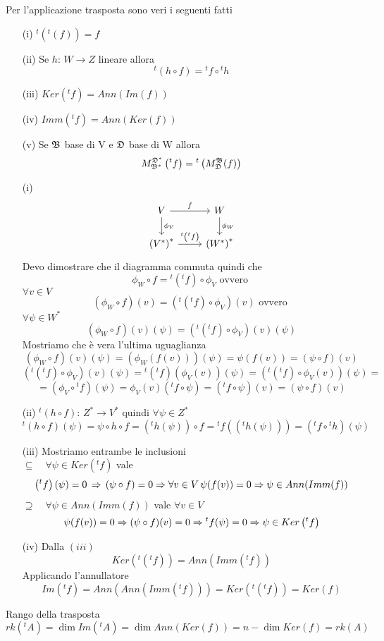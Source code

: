 \begin{prop}Per l'applicazione trasposta sono veri i seguenti fatti
\begin{itemize}
\item[(i)] ${}^t \left( {}^t (f) \right)=f$
\item[(ii)] Se $h:\, W \to Z$ lineare allora
$$ {}^t(h \circ f ) = {}^t f \circ {}^t h$$
\item[(iii)]$ Ker ({}^t f )=Ann(Im (f) ) $ 
\item[(iv)] $Imm ({}^t f )=Ann(Ker (f) ) $
\item[(v)] Se $\mathfrak{B} $ base di V e $\mathfrak{D}$ base di W allora
$$ M_{\mathfrak{B}^*} ^{\mathfrak{D}^*} \left({}^tf \right) = {}^t \left( M_{\mathfrak{D}} ^{\mathfrak{B}} (f) \right)$$
\end{itemize}
\proof \bianco
\begin{itemize}
\item[(i)]
$$
\begin{tikzcd}
V 
\arrow[r,"f"]
\arrow{d}{\phi_V} 
&W 
\arrow{d}{\phi_W}\\
\left( V ^* \right)^* 
\arrow{r}{{}^t \left( {}^t f\right)}
&\left( W ^* \right)^* 
\end{tikzcd} $$
Devo dimostrare che il diagramma commuta quindi che 
$$ \phi_W \circ f = {}^t \left( {}^t f\right) \circ \phi_V \text{ ovvero }$$
$ \forall v \in V $
$$( \phi_W \circ f)(v) =  \left( {}^t \left( {}^t f\right) \circ \phi_V \right) (v) \text{ ovvero } $$
$\forall \psi \in W^* $ 
$$( \phi_W \circ f)(v) (\psi) =  \left( {}^t \left( {}^t f\right) \circ \phi_V \right) (v) (\psi)  $$
Mostriamo che \`e vera l'ultima uguaglianza 
$$ ( \phi_W \circ f)(v) (\psi) =( \phi_W (f(v)) ) (\psi)=\psi(f(v))=(\psi \circ f ) (v) $$
 $$\left( {}^t \left( {}^t f\right) \circ \phi_V \right) (v) (\psi)= 
{}^t \left( {}^t f \right) (  \phi_V(v))( \psi) =\left( {}^t \left( {}^t f \right)  \circ \phi_V (v)\right)(\psi)=$$
$$= \left( \phi_V \circ {}^t f \right) (\psi)= \phi_V(v)\left( {}^t f \circ \psi \right)=\left( {}^t f \circ \psi \right) (v)=(\psi \circ f ) (v) $$
\item[(ii)] ${}^t ( h \circ f ) :\, Z^* \to V^* $ quindi $\forall \psi \in Z^*$
$${}^t ( h \circ f )(\psi) = \psi \circ h \circ f = \left( {}^t h ( \psi) \right) \circ f ={}^t f \left( \left( {}^t h ( \psi) \right) \right)=\left( {}^t f \circ {}^t h \right) (\psi)  $$
\item[(iii)]Mostriamo entrambe le inclusioni\\
$\subseteq \quad \forall \psi \in Ker \left( {}^t f \right)$ vale 
$$ \left( {}^t f \right) (\psi) = 0 \, \Rightarrow \, (\psi \circ f ) = 0 \Rightarrow \forall v \in V  \, \psi(f(v))=0 \Rightarrow \psi \in Ann (Imm(f)) $$
$\supseteq \quad \forall \psi \in Ann(Imm(f))$ vale $ \forall v \in V$
$$ \psi(f(v))=0 \Rightarrow ( \psi \circ f ) (v)=0 \Rightarrow {}^t f ( \psi)=0 \Rightarrow \psi \in Ker \left( {}^t f \right) $$
\item[(iv)] Dalla $(iii) $ 
$$ Ker \left( {}^t \left( {}^t f \right) \right)= Ann \left( Imm \left( {}^t f \right) \right) $$
Applicando l'annullatore
$$ Im\left( {}^t f \right) = Ann \left( Ann \left( Imm \left( {}^t f \right) \right)\right)=Ker \left( {}^t \left( {}^t f \right) \right)=Ker (f)$$
\end{itemize}
\end{prop}
\begin{cor} Rango della trasposta
\proof
$$ rk\left( {}^t A\right) = \dim Im \left( {}^t A \right)=\dim Ann (Ker (f)) = n -\dim Ker(f)=rk(A)$$
\endproof
\end{cor}
%

